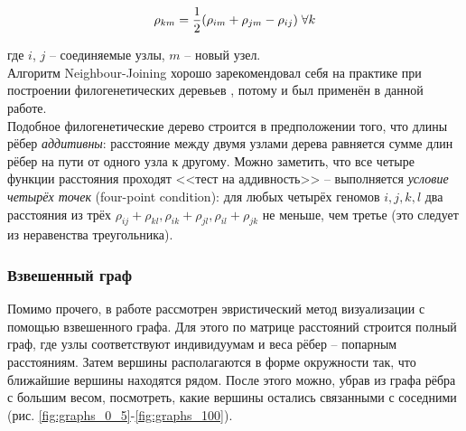 \documentclass[main.tex]{subfiles}
\begin{document}
$$ \rho_{km} = \frac{1}{2} (\rho_{im} + \rho_{jm} - \rho_{ij}) \thickspace \forall k $$

где $i$, $j$ -- соединяемые узлы, $m$ -- новый узел.\\

Алгоритм Neighbour-Joining хорошо зарекомендовал себя на практике при построении филогенетических деревьев \cite{durbin}, потому и был применён в данной работе. \\

Подобное филогенетические дерево строится в предположении того, что длины рёбер \textit{аддитивны}: расстояние между двумя узлами дерева равняется сумме длин рёбер на пути от одного узла к другому. Можно заметить, что все четыре функции расстояния проходят <<тест на аддивность>> -- выполняется \textit{условие четырёх точек} (four-point condition): для любых четырёх геномов $ i, j, k, l $ два расстояния из трёх $ \rho_{ij} + \rho_{kl}, \rho_{ik} + \rho_{jl}, \rho_{il} + \rho_{jk} $ не меньше, чем третье (это следует из неравенства треугольника).

\subsubsection{Взвешенный граф} \label{section:viz:graph}

Помимо прочего, в работе рассмотрен эвристический метод визуализации с помощью взвешенного графа. Для этого по матрице расстояний строится полный граф, где узлы соответствуют индивидуумам и веса рёбер -- попарным расстояниям. Затем вершины располагаются в форме окружности так, что ближайшие вершины находятся рядом. После этого можно, убрав из графа рёбра с большим весом, посмотреть, какие вершины остались связанными с соседними (рис. \ref{fig:graphs_0_5}-\ref{fig:graphs_100}).
\end{document}
